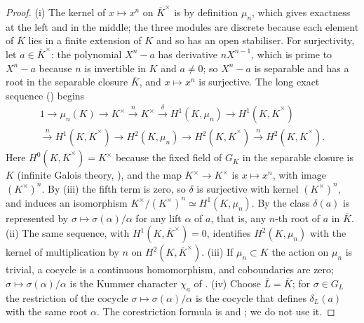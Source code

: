 \begin{proof}
(i) The kernel of $x\mapsto x^n$ on $\overline K^\times$ is by definition $\mu_n$, which gives exactness at the left and in the middle; the three modules are discrete because
each element of $\overline K$ lies in a finite extension of $K$ and so has an open stabiliser. For surjectivity, let $a\in\overline K^\times$: the polynomial $X^n-a$ has derivative $nX^{n-1}$, which is prime to $X^n-a$ because $n$
is invertible in $K$ and $a\ne0$; so $X^n-a$ is separable and has a root in the separable closure $\overline K$, and $x\mapsto x^n$ is surjective. The long exact sequence
() begins
\begin{multline*}
1\to\mu_n(K)\to K^\times\xrightarrow{\ n\ }K^\times\xrightarrow{\ \delta\ }H^1(K,\mu_n)\to H^1(K,\overline K^\times)\\
\xrightarrow{\ n\ }H^1(K,\overline K^\times)\to H^2(K,\mu_n)\to H^2(K,\overline K^\times)\xrightarrow{\ n\ }H^2(K,\overline K^\times).
\end{multline*}
Here $H^0(K,\overline K^\times)=K^\times$ because the fixed field of $G_K$ in the separable closure is $K$ (infinite Galois theory, ), and the map
$K^\times\to K^\times$ is $x\mapsto x^n$, with image $(K^\times)^n$. By (iii) the fifth term is zero, so $\delta$ is surjective with kernel
$(K^\times)^n$, and induces an isomorphism $K^\times/(K^\times)^n\simeq H^1(K,\mu_n)$. By
 the class $\delta(a)$ is represented by $\sigma\mapsto\sigma(\alpha)/\alpha$ for any lift $\alpha$ of $a$, that is, any $n$-th root of $a$ in
$\overline K$. (ii) The same sequence, with $H^1(K,\overline K^\times)=0$, identifies $H^2(K,\mu_n)$ with the kernel of multiplication by $n$ on $H^2(K,\overline K^\times)$.
(iii) If $\mu_n\subset K$ the action on $\mu_n$ is trivial, a cocycle is a continuous homomorphism, and coboundaries are zero; $\sigma\mapsto\sigma(\alpha)/\alpha$ is
the Kummer character $\chi_a$ of . (iv) Choose $\overline L=\overline K$; for $\sigma\in G_L$ the restriction of the cocycle $\sigma\mapsto\sigma(\alpha)/\alpha$
is the cocycle that defines $\delta_L(a)$ with the same root $\alpha$. The corestriction formula is \cite[Chapter XIV, Section 1]{SerreLocalFields} and
\cite[Chapter VI, Section 2]{NSW}; we do not use it.
\end{proof}

